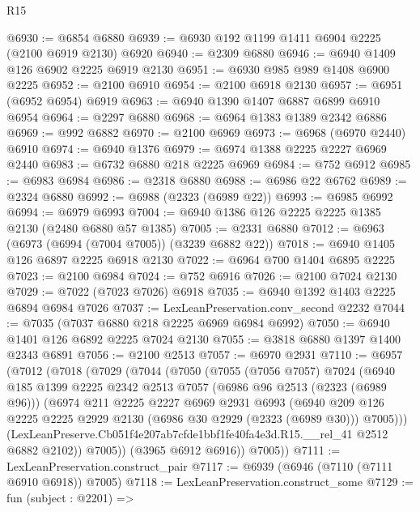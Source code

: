\begin{lexlean}{R15}
\begin{coremodule}
@6930 := @6854 @6880
@6939 := @6930 @192 @1199 @1411 @6904 @2225 (@2100 @6919 @2130) @6920
@6940 := @2309 @6880
@6946 := @6940 @1409 @126 @6902 @2225 @6919 @2130
@6951 := @6930 @985 @989 @1408 @6900 @2225
@6952 := @2100 @6910
@6954 := @2100 @6918 @2130
@6957 := @6951 (@6952 @6954) @6919
@6963 := @6940 @1390 @1407 @6887 @6899 @6910 @6954
@6964 := @2297 @6880
@6968 := @6964 @1383 @1389 @2342 @6886
@6969 := @992 @6882
@6970 := @2100 @6969
@6973 := @6968 (@6970 @2440) @6910
@6974 := @6940 @1376
@6979 := @6974 @1388 @2225 @2227 @6969 @2440
@6983 := @6732 @6880 @218 @2225 @6969
@6984 := @752 @6912
@6985 := @6983 @6984
@6986 := @2318 @6880
@6988 := @6986 @22 @6762
@6989 := @2324 @6880
@6992 := @6988 (@2323 (@6989 @22))
@6993 := @6985 @6992
@6994 := @6979 @6993
@7004 := @6940 @1386 @126 @2225 @2225 @1385 @2130 (@2480 @6880 @57 @1385)
@7005 := @2331 @6880
@7012 := @6963 (@6973 (@6994 (@7004 @7005)) (@3239 @6882 @22))
@7018 := @6940 @1405 @126 @6897 @2225 @6918 @2130
@7022 := @6964 @700 @1404 @6895 @2225
@7023 := @2100 @6984
@7024 := @752 @6916
@7026 := @2100 @7024 @2130
@7029 := @7022 (@7023 @7026) @6918
@7035 := @6940 @1392 @1403 @2225 @6894 @6984 @7026
@7037 := LexLeanPreservation.conv_second @2232
@7044 := @7035 (@7037 @6880 @218 @2225 @6969 @6984 @6992)
@7050 := @6940 @1401 @126 @6892 @2225 @7024 @2130
@7055 := @3818 @6880 @1397 @1400 @2343 @6891
@7056 := @2100 @2513
@7057 := @6970 @2931
@7110 := @6957
    (@7012
      (@7018
        (@7029
          (@7044
            (@7050
              (@7055
                (@7056 @7057)
                @7024
                (@6940
                  @185
                  @1399
                  @2225
                  @2342
                  @2513
                  @7057
                  (@6986 @96 @2513 (@2323 (@6989 @96)))
                  (@6974
                    @211
                    @2225
                    @2227
                    @6969
                    @2931
                    @6993
                    (@6940
                      @209
                      @126
                      @2225
                      @2225
                      @2929
                      @2130
                      (@6986 @30 @2929 (@2323 (@6989 @30)))
                      @7005)))
                (LexLeanPreserve.Cb051f4e207ab7cfde1bbf1fe40fa4e3d.R15.__rel_41 @2512 @6882 @2102))
              @7005))
          (@3965 @6912 @6916))
        @7005))
@7111 := LexLeanPreservation.construct_pair
@7117 := @6939 (@6946 (@7110 (@7111 @6910 @6918)) @7005)
@7118 := LexLeanPreservation.construct_some
@7129 := fun (subject : @2201) =>

\end{coremodule}
\end{lexlean}
